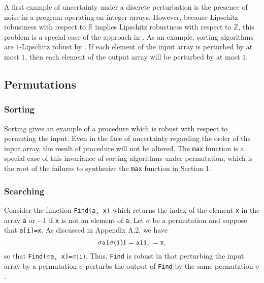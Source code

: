 \documentclass{llncs}
\DeclareMathOperator{\Perm}{Perm}
\DeclareMathOperator{\len}{length}
\begin{document}
  A first example of uncertainty under a discrete perturbation is the presence
  of noise in a program operating on integer arrays.  However, because Lipschitz
  robustness with respect to \(\mathbb{R}\) implies Lipschitz robustness with
  respect to \(\mathbb{Z}\), this problem is a special case of the approach in
  \cite{chaudhuri10,chaudhuri11}.  As an example, sorting algorithms are
  \(1\)-Lipschitz robust by \cite{chaudhuri10,chaudhuri11}.
  If each element of the input array is perturbed by at most
  \(1\), then each element of the output array will be perturbed by at most \(1\).

  \subsection{Permutations}


    \subsubsection{Sorting}

      Sorting gives an example of a procedure which is robust with respect to permuting
      the input.  Even in the face of uncertainty regarding the order of the input
      array, the result of procedure will not be altered.  The \verb!max! function is
      a special case of this invariance of sorting algorithms under permutation, which
      is the root of the failures to synthesize the \verb!max!
      function in Section 1.

    \subsubsection{Searching}

      Consider the function \verb!Find(a, x)! which returns the index of the element
      \verb!x! in the array \verb!a! or \(-1\) if \verb!x! is not an element of
      \verb!a!.  Let \(\sigma\) be a permutation and suppose that \verb!a[i]=x!.
      As discussed in Appendix A.2, we have
      \[
        \sigma\verb!a[!\sigma(\verb!i!)\verb!]! = \verb!a[i]! = \verb!x!,
      \] 
      so that \verb!Find(!\(\sigma\)\verb!a, x)=!\(\sigma(\)\verb!i!\()\).
      Thus, \verb!Find! is
      robust in that perturbing the input array by a permutation \(\sigma\) perturbs
      the output of \verb!Find! by the same permutation \(\sigma\).
\end{document}
